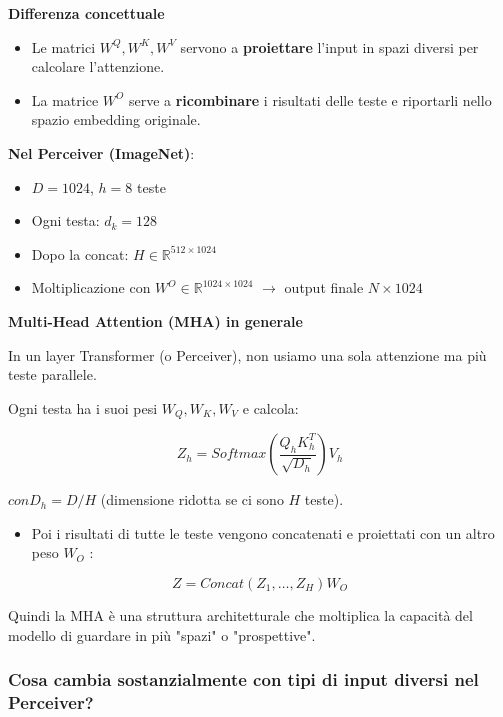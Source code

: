 \documentclass[
  11pt,
]{article}
\begin{document}
\textbf{Differenza concettuale}
\begin{itemize}
\item Le matrici $W^Q, W^K, W^V$ servono a \textbf{proiettare} l'input in spazi diversi per calcolare l'attenzione.
\item La matrice $W^O$ serve a \textbf{ricombinare} i risultati delle teste e riportarli nello spazio embedding originale.
\end{itemize}

\textbf{Nel Perceiver (ImageNet)}:

\begin{itemize}
\item $D = 1024$, $h = 8$ teste
\item Ogni testa: $d_k = 128$
\item Dopo la concat: $H \in \mathbb{R}^{512 \times 1024}$
\item Moltiplicazione con $W^O \in \mathbb{R}^{1024 \times 1024}$ $\to$ output finale $N \times 1024$
\end{itemize}

\textbf{Multi-Head Attention (MHA) in generale}

In un layer Transformer (o Perceiver), non usiamo una sola attenzione ma
più teste parallele.

Ogni testa ha i suoi pesi \(W_{Q},W_{K},W_{V}\) e calcola:

\[Z_{h} = Softmax\left( \frac{Q_{h}K_{h}^{T}}{\sqrt{D_{h}}} \right)V_{h}\]

\(conD_{h} = D/H\) (dimensione ridotta se ci sono \(H\) teste).

\begin{itemize}
\item
  Poi i risultati di tutte le teste vengono concatenati e proiettati con
  un altro peso \(W_{O}\) :
\end{itemize}

\[Z = Concat\left( Z_{1},\ldots,Z_{H} \right)W_{O}\]

Quindi la MHA è una struttura architetturale che moltiplica la capacità
del modello di guardare in più "spazi" o "prospettive".

\subsubsection{\texorpdfstring{\textbf{Cosa cambia sostanzialmente con
tipi di input diversi nel
Perceiver?}}{Cosa cambia sostanzialmente con tipi di input diversi nel Perceiver?}}\label{cosa-cambia-sostanzialmente-con-tipi-di-input-diversi-nel-perceiver}
\end{document}
